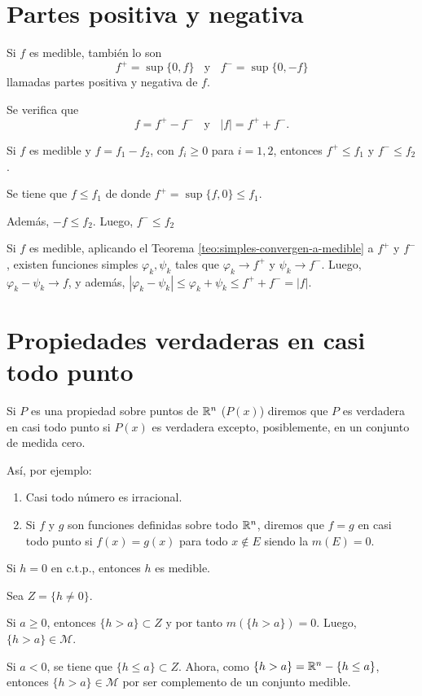 \section{Partes positiva y negativa}

Si $f$ es medible, tambi\'en lo son 
\[
f^+=\sup\{0,f \}\;\;\mbox{ y }\;\;f^{-}=\sup\{0,-f\}
\]
llamadas partes positiva y negativa de $f$.

Se verifica que 
\[
f=f^{+}-f^{-}\;\;\mbox{ y }\;\; |f|=f^{+}+f^{-}.
\]

\begin{teorema}{}
Si $f$ es medible y $f=f_1-f_2$, con $f_i\geq 0$ para $i=1,2$, entonces
$f^{+}\leq f_1$ y $f^{-}\leq f_2$.
\end{teorema}

\begin{demo}
Se tiene que $f\leq f_1$ de donde $f^+=\sup\{ f,0\}\leq f_1$. 

Adem\'as, $-f \leq f_2$. Luego, $f^{-}\leq f_2$
\end{demo}

Si $f$ es medible,  aplicando el Teorema \ref{teo:simples-convergen-a-medible} a $f^+$ y $f^{-}$, 
existen funciones simples $\varphi_k,\psi_k$ tales que $\varphi_k \to f^+$
y $\psi_k \to f^{-}$. Luego, 
$\varphi_k - \psi_k \to f$, y adem\'as, $|\varphi_k-\psi_k|\leq \varphi_k+\psi_k \leq f^{+}+f^{-}=|f|$.

\section{Propiedades verdaderas en casi todo punto}

Si $P$ es una propiedad sobre puntos de $\mathbb{R}^n$ ($P(x)$) diremos que $P$ es verdadera en casi todo punto si $P(x)$ es verdadera excepto, posiblemente, en un conjunto de medida cero. 

As\'i, por ejemplo:
\begin{enumerate}
    \item Casi todo n\'umero es irracional.
    \item  Si $f$ y $g$ son funciones definidas sobre todo $\mathbb{R}^n$, diremos que $f=g$ en casi todo punto si $f(x)=g(x)$ para todo  
    $x \notin E$  siendo la  $m(E)=0$.
\end{enumerate}

\begin{teorema}{}
Si $h=0$ en c.t.p., entonces $h$ es medible.
\end{teorema}

\begin{demo}
Sea $Z=\{h \neq 0\}$. 

Si $a \geq 0$, entonces $\{h>a\}\subset Z$ y por tanto $m(\{h>a\})=0.$ Luego, $\{h>a\} \in \mathscr{M}$.

Si $a < 0$, se tiene que  $\{h\leq a\}\subset Z$. Ahora,  como $\{h>a\}=\mathbb{R}^n-\{h\leq a\}$, entonces  $\{h>a\} \in \mathscr{M}$ por ser complemento de un conjunto medible.
\end{demo}



